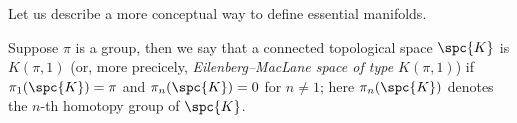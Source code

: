 


















Let us describe a more conceptual way to define essential manifolds.

Suppose $\pi$ is a group,
then we say that a connected topological space $\spc{K}$ is \emph{$K(\pi,1)$} (or, more precicely, \emph{Eilenberg--MacLane space of type $K(\pi,1)$})
if $\pi_1(\spc{K})=\pi$ and $\pi_n(\spc{K})=0$ for $n\ne 1$;
here $\pi_n(\spc{K})$ denotes the $n$-th homotopy group of $\spc{K}$.

